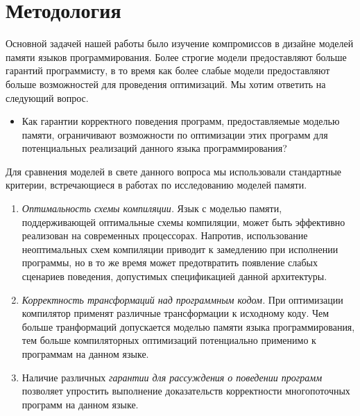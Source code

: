 \section{Методология}
\label{sec:methodology}

Основной задачей нашей работы было изучение
компромиссов в дизайне моделей памяти 
языков программирования. 
Более строгие модели предоставляют больше гарантий программисту,
в то время как более слабые модели предоставляют 
больше возможностей для проведения оптимизаций. 
Мы хотим ответить на следующий вопрос. 

\begin{itemize}
  \item Как гарантии  корректного поведения программ, 
    предоставляемые моделью памяти, ограничивают возможности 
    по оптимизации этих программ для потенциальных реализаций
    данного языка программирования?
\end{itemize}



Для сравнения моделей в свете данного вопроса мы использовали стандартные критерии,
встречающиеся в работах по исследованию моделей памяти. 

\begin{enumerate}[label=\textbf{C.\arabic*}]
  
  \item \label{item:criteria:opt-comp}
    \emph{Оптимальность схемы компиляции.}
    Язык с моделью памяти, поддерживающей оптимальные 
    схемы компиляции, может быть эффективно реализован
    на современных процессорах. 
    Напротив, использование неоптимальных схем компиляции
    приводит к замедлению при исполнении программы, 
    но в то же время может предотвратить появление 
    слабых сценариев поведения, допустимых спецификацией данной архитектуры. 

  \item \label{item:criteria:sound-trans}
    \emph{Корректность трансформаций над программным кодом.} 
    При оптимизации компилятор
    применят различные трансформации к исходному коду. 
    Чем больше транформаций допускается моделью памяти языка программирования, 
    тем больше компиляторных оптимизаций потенциально применимо 
    к программам на данном языке. 

  \item \label{item:criteria:reasoning}
    Наличие  различных \emph{гарантии для рассуждения о поведении программ}
    позволяет упростить  выполнение доказательств  корректности 
    многопоточных программ  на данном языке. 
  
\end{enumerate}

